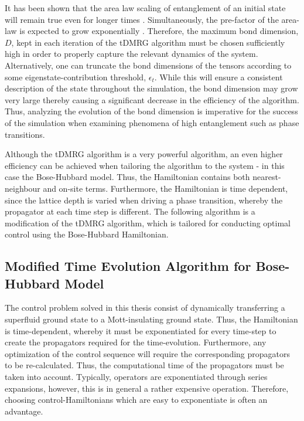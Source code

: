 It has been shown that the area law scaling of entanglement of an initial state will remain true even for longer times \cite{Bravyi2006,Eisert2006}. Simultaneously, the pre-factor of the area-law is expected to grow exponentially \cite{Schuch2008}. Therefore, the maximum bond dimension, $D$, kept in each iteration of the tDMRG algorithm must be chosen sufficiently high in order to properly capture the relevant dynamics of the system. Alternatively, one can truncate the bond dimensions of the tensors according to some eigenstate-contribution threshold, $\epsilon_t$. While this will ensure a consistent description of the state throughout the simulation, the bond dimension may grow very large thereby causing a significant decrease in the efficiency of the algorithm. Thus, analyzing the evolution of the bond dimension is imperative for the success of the simulation when examining phenomena of high entanglement such as phase transitions.

Although the tDMRG algorithm is a very powerful algorithm, an even higher efficiency can be achieved when tailoring the algorithm to the system - in this case the Bose-Hubbard model. Thus, the Hamiltonian contains both nearest-neighbour and on-site terms. Furthermore, the Hamiltonian is time dependent, since the lattice depth is varied when driving a phase transition, whereby the propagator at each time step is different. The following algorithm is a modification of the tDMRG algorithm, which is tailored for conducting optimal control using the Bose-Hubbard Hamiltonian.


\subsection{Modified Time Evolution Algorithm for Bose-Hubbard Model}
\label{sec:modTMDRG}
The control problem solved in this thesis consist of dynamically transferring a superfluid ground state to a Mott-insulating ground state. Thus, the Hamiltonian is time-dependent, whereby it must be exponentiated for every time-step to create the propagators required for the time-evolution. Furthermore, any optimization of the control sequence will require the corresponding propagators to be re-calculated. Thus, the computational time of the propagators must be taken into account. Typically, operators are exponentiated through series expansions, however, this is in general a rather expensive operation. Therefore, choosing control-Hamiltonians which are easy to exponentiate is often an advantage.

